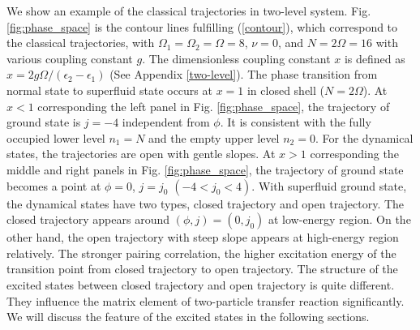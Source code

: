 \documentclass[11pt]{book} %
\begin{document}
We show an example of the classical trajectories in two-level system. Fig. \ref{fig:phase_space} is the contour lines fulfilling (\ref{contour}), which correspond to the classical trajectories, with $\Omega_1=\Omega_2=\Omega=8$, $\nu=0$, and $N=2\Omega=16$ with various coupling constant $g$. The dimensionless coupling constant $x$ is defined as $x=2g\Omega/(\epsilon_2-\epsilon_1)$ (See Appendix \ref{two-level}). The phase transition from normal state to superfluid state occurs at $x=1$ in closed shell ($N=2\Omega$). At $x<1$ corresponding the left panel in Fig. \ref{fig:phase_space}, the trajectory of ground state is $j=-4$ independent from $\phi$. It is consistent with the fully occupied lower level $n_1=N$ and the empty upper level $n_2=0$. For the dynamical states, the trajectories are open with gentle slopes. At $x>1$ corresponding the middle and right panels in Fig. \ref{fig:phase_space}, the trajectory of ground state becomes a point at $\phi=0$, $j=j_0$ $(-4<j_0<4)$. With superfluid ground state, the dynamical states have two types, closed trajectory and open trajectory. The closed trajectory appears around $(\phi,j)=(0,j_0)$ at low-energy region. On the other hand, the open trajectory with steep slope appears at high-energy region relatively. The stronger pairing correlation, the higher excitation energy of the transition point from closed trajectory to open trajectory. The structure of the excited states between closed trajectory and open trajectory is quite different. They influence the matrix element of two-particle transfer reaction significantly. We will discuss the feature of the excited states in the following sections.
\end{document}
